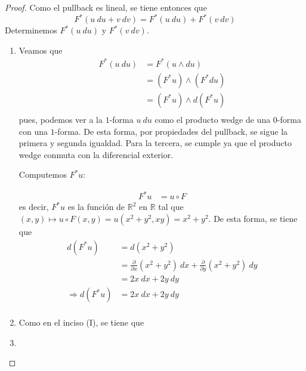 \documentclass[12pt]{report}
\theoremstyle{largebreak}
\begin{document}
    \begin{proof}
        Como el pullback es lineal, se tiene entonces que
        \begin{equation*}
            F^*(u\:du+v\:dv)=F^*(u\:du)+F^*(v\:dv)
        \end{equation*}
        Determinemos $F^*(u\:du)$ y $F^*(v\:dv)$.
        \begin{enumerate}
            \item Veamos que
            \begin{equation*}
                \begin{split}
                    F^*(u\:du)&=F^*(u\wedge du)\\
                    &=(F^*u)\wedge(F^*du)\\
                    &=(F^*u)\wedge d(F^*u)\\
                \end{split}
            \end{equation*}
            pues, podemos ver a la $1$-forma $u\:du$ como el producto wedge de una $0$-forma con una $1$-forma. De esta forma, por propiedades del pullback, se sigue la primera y segunda igualdad. Para la tercera, se cumple ya que el producto wedge conmuta con la diferencial exterior.
            
            Computemos $F^*u$:

            \begin{equation*}
                \begin{split}
                    F^*u&=u\circ F
                \end{split}
            \end{equation*}
            es decir, $F^*u$ es la función de $\mathbb{R}^2$ en $\mathbb{R}$ tal que $(x,y)\mapsto u\circ F(x,y)=u(x^2+y^2,xy)=x^2+y^2$. De esta forma, se tiene que
            \begin{equation*}
                \begin{split}
                    d(F^*u)&=d(x^2+y^2)\\
                    &=\frac{\partial }{\partial x}(x^2+y^2)\:dx+\frac{\partial }{\partial y}(x^2+y^2)\:dy\\
                    &=2x\:dx+2y\:dy\\
                    \Rightarrow d(F^*u)&=2x\:dx+2y\:dy\\
                \end{split}
            \end{equation*}
            \item Como en el inciso (I), se tiene que
            \item 
        \end{enumerate}
    \end{proof}
\end{document}
